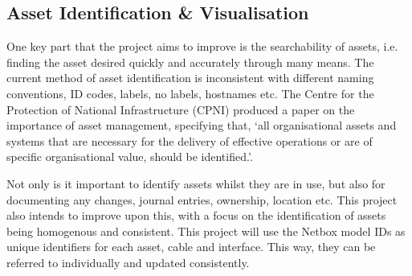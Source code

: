 \documentclass [11pt,a4paper]{article}
\begin{document}
\subsection{Asset Identification \& Visualisation}
\label{sec:technical}

One key part that the project aims to improve is the searchability of assets, i.e. finding the asset desired quickly and accurately through many means. The current method of asset identification is inconsistent with different naming conventions, ID codes, labels, no labels, hostnames etc. The Centre for the Protection of National Infrastructure (CPNI) produced a paper on the importance of asset management, specifying that, `all organisational assets and systems that are necessary for the delivery of effective operations or are of specific organisational value, should be identified.'\cite{cpni}.

Not only is it important to identify assets whilst they are in use, but also for documenting any changes, journal entries, ownership, location etc. This project also intends to improve upon this, with a focus on the identification of assets being homogenous and consistent. This project will use the Netbox model IDs as unique identifiers for each asset, cable and interface. This way, they can be referred to individually and updated consistently. 
\end{document}

